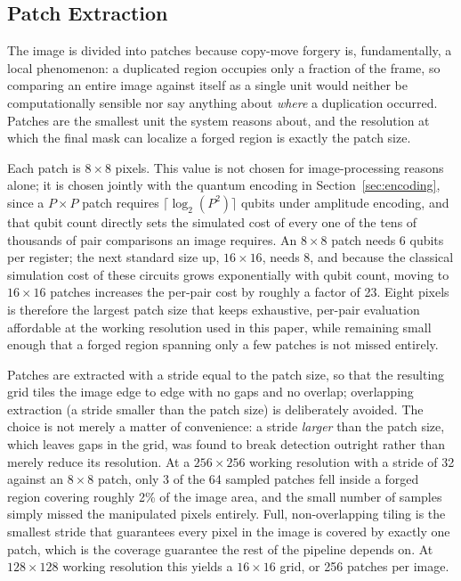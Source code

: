 \documentclass[conference]{IEEEtran}
\begin{document}
\subsection{Patch Extraction}\label{sec:patches}
The image is divided into patches because copy-move forgery is, fundamentally, a local phenomenon: a duplicated region occupies only a fraction of the frame, so comparing an entire image against itself as a single unit would neither be computationally sensible nor say anything about \emph{where} a duplication occurred. Patches are the smallest unit the system reasons about, and the resolution at which the final mask can localize a forged region is exactly the patch size.

Each patch is $8\times8$ pixels. This value is not chosen for image-processing reasons alone; it is chosen jointly with the quantum encoding in Section~\ref{sec:encoding}, since a $P\times P$ patch requires $\lceil \log_2(P^2)\rceil$ qubits under amplitude encoding, and that qubit count directly sets the simulated cost of every one of the tens of thousands of pair comparisons an image requires. An $8\times8$ patch needs 6 qubits per register; the next standard size up, $16\times16$, needs 8, and because the classical simulation cost of these circuits grows exponentially with qubit count, moving to $16\times16$ patches increases the per-pair cost by roughly a factor of 23. Eight pixels is therefore the largest patch size that keeps exhaustive, per-pair evaluation affordable at the working resolution used in this paper, while remaining small enough that a forged region spanning only a few patches is not missed entirely.

Patches are extracted with a stride equal to the patch size, so that the resulting grid tiles the image edge to edge with no gaps and no overlap; overlapping extraction (a stride smaller than the patch size) is deliberately avoided. The choice is not merely a matter of convenience: a stride \emph{larger} than the patch size, which leaves gaps in the grid, was found to break detection outright rather than merely reduce its resolution. At a $256\times256$ working resolution with a stride of 32 against an $8\times8$ patch, only 3 of the 64 sampled patches fell inside a forged region covering roughly 2\% of the image area, and the small number of samples simply missed the manipulated pixels entirely. Full, non-overlapping tiling is the smallest stride that guarantees every pixel in the image is covered by exactly one patch, which is the coverage guarantee the rest of the pipeline depends on. At $128\times128$ working resolution this yields a $16\times16$ grid, or 256 patches per image.
\end{document}

